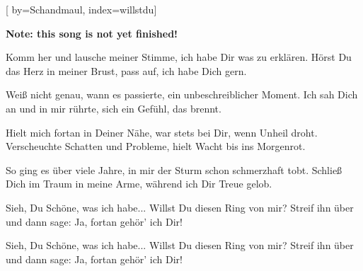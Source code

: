 

[%
    by={Schandmaul},
    index={willstdu}]


    \label{willstdu}

    \textbf{Note: this song is not yet finished!}

    \beginverse
        Komm her und lausche meiner Stimme,
        ich habe Dir was zu erkl\"{a}ren.
        H\"{o}rst Du das Herz in meiner Brust,
        pass auf, ich habe Dich gern.
    \endverse

    \beginverse
        Wei\ss{} nicht genau, wann es passierte,
        ein unbeschreiblicher Moment.
        Ich sah Dich an und in mir r\"{u}hrte,
        sich ein Gef\"{u}hl, das brennt.
    \endverse

    \beginverse
        Hielt mich fortan in Deiner N\"{a}he,
        war stets bei Dir, wenn Unheil droht.
        Verscheuchte Schatten und Probleme,
        hielt Wacht bis ins Morgenrot.
    \endverse

    \beginverse
        So ging es \"{u}ber viele Jahre,
        in mir der Sturm schon schmerzhaft tobt.
        Schlie\ss{} Dich im Traum in meine Arme,
        w\"{a}hrend ich Dir Treue gelob.
    \endverse

    \beginchorus
        Sieh, Du Sch\"{o}ne, was ich habe...
        Willst Du diesen Ring von mir?
        Streif ihn \"{u}ber und dann sage:
        Ja, fortan geh\"{o}r' ich Dir!
    \endchorus

    \beginverse*
    \endverse

    \beginchorus
        Sieh, Du Sch\"{o}ne, was ich habe...
        Willst Du diesen Ring von mir?
        Streif ihn \"{u}ber und dann sage:
        Ja, fortan geh\"{o}r' ich Dir!
    \endchorus
\endsong
